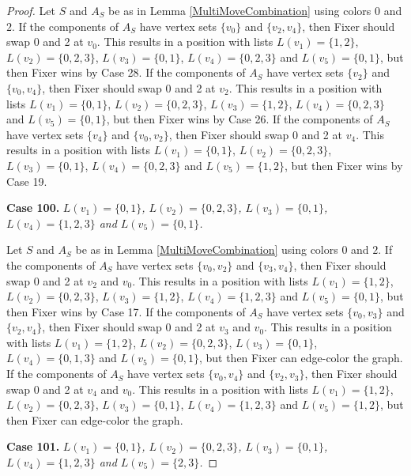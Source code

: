 \documentclass[12pt]{amsart}
\theoremstyle{plain}
\theoremstyle{definition}
\theoremstyle{remark}
\begin{document}
\begin{proof}
Let $S$ and $A_S$ be as in Lemma \ref{MultiMoveCombination} using colors $0$ and $2$. If the components of $A_S$ have vertex sets $\{v_0\}$ and $\{v_2, v_4\}$, then Fixer should swap 0 and 2 at $v_0$. This results in a position with lists $L(v_1) = \{1, 2\}$, $L(v_2) = \{0, 2, 3\}$, $L(v_3) = \{0, 1\}$, $L(v_4) = \{0, 2, 3\}$ and $L(v_5) = \{0, 1\}$, but then Fixer wins by Case 28.
If the components of $A_S$ have vertex sets $\{v_2\}$ and $\{v_0, v_4\}$, then Fixer should swap 0 and 2 at $v_2$. This results in a position with lists $L(v_1) = \{0, 1\}$, $L(v_2) = \{0, 2, 3\}$, $L(v_3) = \{1, 2\}$, $L(v_4) = \{0, 2, 3\}$ and $L(v_5) = \{0, 1\}$, but then Fixer wins by Case 26.
If the components of $A_S$ have vertex sets $\{v_4\}$ and $\{v_0, v_2\}$, then Fixer should swap 0 and 2 at $v_4$. This results in a position with lists $L(v_1) = \{0, 1\}$, $L(v_2) = \{0, 2, 3\}$, $L(v_3) = \{0, 1\}$, $L(v_4) = \{0, 2, 3\}$ and $L(v_5) = \{1, 2\}$, but then Fixer wins by Case 19.

\noindent\textbf{Case 100.  }\textit{$L(v_1) = \{0, 1\}$, $L(v_2) = \{0, 2, 3\}$, $L(v_3) = \{0, 1\}$, $L(v_4) = \{1, 2, 3\}$ and $L(v_5) = \{0, 1\}$.}

Let $S$ and $A_S$ be as in Lemma \ref{MultiMoveCombination} using colors $0$ and $2$. If the components of $A_S$ have vertex sets $\{v_0, v_2\}$ and $\{v_3, v_4\}$, then Fixer should swap 0 and 2 at $v_2$ and $v_0$. This results in a position with lists $L(v_1) = \{1, 2\}$, $L(v_2) = \{0, 2, 3\}$, $L(v_3) = \{1, 2\}$, $L(v_4) = \{1, 2, 3\}$ and $L(v_5) = \{0, 1\}$, but then Fixer wins by Case 17.
If the components of $A_S$ have vertex sets $\{v_0, v_3\}$ and $\{v_2, v_4\}$, then Fixer should swap 0 and 2 at $v_3$ and $v_0$. This results in a position with lists $L(v_1) = \{1, 2\}$, $L(v_2) = \{0, 2, 3\}$, $L(v_3) = \{0, 1\}$, $L(v_4) = \{0, 1, 3\}$ and $L(v_5) = \{0, 1\}$, but then Fixer can edge-color the graph.
If the components of $A_S$ have vertex sets $\{v_0, v_4\}$ and $\{v_2, v_3\}$, then Fixer should swap 0 and 2 at $v_4$ and $v_0$. This results in a position with lists $L(v_1) = \{1, 2\}$, $L(v_2) = \{0, 2, 3\}$, $L(v_3) = \{0, 1\}$, $L(v_4) = \{1, 2, 3\}$ and $L(v_5) = \{1, 2\}$, but then Fixer can edge-color the graph.

\noindent\textbf{Case 101.  }\textit{$L(v_1) = \{0, 1\}$, $L(v_2) = \{0, 2, 3\}$, $L(v_3) = \{0, 1\}$, $L(v_4) = \{1, 2, 3\}$ and $L(v_5) = \{2, 3\}$.}


\end{proof}
\end{document}
